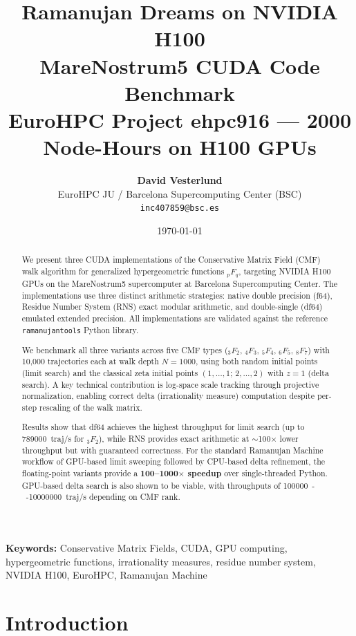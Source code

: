 \documentclass[11pt,a4paper]{article}
\title{
    \vspace{-1cm}
    {\Large \textbf{Ramanujan Dreams on NVIDIA H100}} \\[0.3cm]
    {\large MareNostrum5 CUDA Code Benchmark} \\[0.2cm]
    {\normalsize EuroHPC Project ehpc916 --- 2000 Node-Hours on H100 GPUs}
}
\author{
    \textbf{David Vesterlund} \\[0.1cm]
    \small EuroHPC JU / Barcelona Supercomputing Center (BSC) \\
    \small \texttt{inc407859@bsc.es}
}
\date{\today}
\begin{document}
\maketitle
\thispagestyle{fancy}

\begin{abstract}
\noindent
We present three CUDA implementations of the Conservative Matrix Field (CMF) walk
algorithm for generalized hypergeometric functions ${}_pF_q$, targeting NVIDIA
H100 GPUs on the MareNostrum5 supercomputer at Barcelona Supercomputing Center.
The implementations use three distinct arithmetic strategies: native double
precision (f64), Residue Number System (RNS) exact modular arithmetic, and
double-single (df64) emulated extended precision. All implementations are
validated against the reference \texttt{ramanujantools} Python library.

We benchmark all three variants across five CMF types (${}_3F_2$, ${}_4F_3$,
${}_5F_4$, ${}_6F_5$, ${}_8F_7$) with 10{,}000 trajectories each at walk depth
$N=1000$, using both random initial points (limit search) and the classical
zeta initial points $(1,\ldots,1;\,2,\ldots,2)$ with $z=1$ (delta search).
A key technical contribution is log-space scale tracking through projective
normalization, enabling correct delta (irrationality measure) computation
despite per-step rescaling of the walk matrix.

Results show that df64 achieves the highest throughput for limit search
(up to \SI{789000}{traj/s} for ${}_3F_2$), while RNS provides exact arithmetic
at $\sim$100$\times$ lower throughput but with guaranteed correctness. For
the standard Ramanujan Machine workflow of GPU-based limit sweeping followed
by CPU-based delta refinement, the floating-point variants provide a
\textbf{100--1000$\times$ speedup} over single-threaded Python. GPU-based
delta search is also shown to be viable, with throughputs of
\SI{100000}{--}\SI{10000000}{traj/s} depending on CMF rank.
\end{abstract}

\vspace{0.3cm}
\noindent\textbf{Keywords:} Conservative Matrix Fields, CUDA, GPU computing,
hypergeometric functions, irrationality measures, residue number system,
NVIDIA H100, EuroHPC, Ramanujan Machine

\tableofcontents
\newpage

\section{Introduction}
\end{document}
